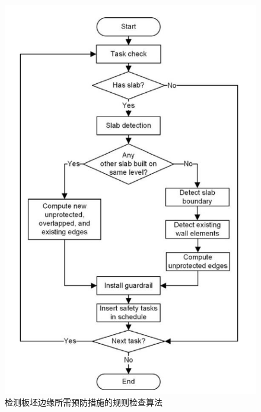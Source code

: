 \begin{figure}[thbp!]
    \centering
    \includegraphics[width=0.8\linewidth]{res/c3f1.png}
    \caption{检测板坯边缘所需预防措施的规则检查算法}
    \label{fig:c3f1}
\end{figure}




